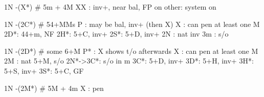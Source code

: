 1N -(X*) # 5m + 4M
XX : inv+, near bal, FP on
other: system on

1N -(2C*) # 54+MMs
P  : may be bal, inv+ (then X)
X  : can pen at least one M
2D*: 44+m, NF
2H*: 5+C, inv+
2S*: 5+D, inv+
2N : nat inv
3m : s/o

1N -(2D*) # some 6+M
P* : X shows t/o afterwards
X  : can pen at least one M
2M : nat 5+M, s/o
2N*->3C*: s/o in m
3C*: 5+D, inv+
3D*: 5+H, inv+
3H*: 5+S, inv+
3S*: 5+C, GF

1N -(2M*) # 5M + 4m
X  : pen
